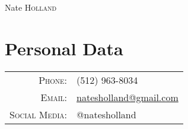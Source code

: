 \documentclass[a4paper,10pt]{article}
\begin{document}
\pagestyle{empty} %

\par{\centering
		{\Huge Nate \textsc{Holland}
	}\bigskip\par}

\section{Personal Data}

\begin{tabular}{rl}
    \textsc{Phone:}     		& (512) 963-8034 \\
    \textsc{Email:}     		& \href{mailto:natesholland@gmail.com}{natesholland@gmail.com} \\
		\textsc{Social Media:}	& @natesholland
\end{tabular}

\end{document}
